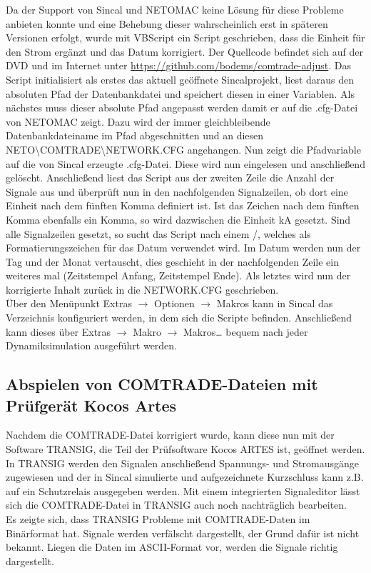 \documentclass{scrartcl}
\begin{document}
\begin{onehalfspace}
Da der Support von Sincal und NETOMAC keine Lösung für diese Probleme anbieten konnte und eine Behebung dieser wahrscheinlich erst in späteren Versionen erfolgt, wurde mit VBScript ein Script geschrieben, dass die Einheit für den Strom ergänzt und das Datum korrigiert. Der Quellcode befindet sich auf der DVD und im Internet unter \url{https://github.com/bodems/comtrade-adjust}. Das Script initialisiert als erstes das aktuell geöffnete Sincalprojekt, liest daraus den absoluten Pfad der Datenbankdatei und speichert diesen in einer Variablen. Als nächstes muss dieser absolute Pfad angepasst werden damit er auf die .cfg-Datei von NETOMAC zeigt. Dazu wird der immer gleichbleibende Datenbankdateiname im Pfad abgeschnitten und an diesen \glqq NETO\textbackslash COMTRADE\textbackslash NETWORK.CFG \grqq{} angehangen. Nun zeigt die Pfadvariable auf die von Sincal erzeugte .cfg-Datei. Diese wird nun eingelesen und anschließend gelöscht. Anschließend liest das Script aus der zweiten Zeile die Anzahl der Signale aus und überprüft nun in den nachfolgenden Signalzeilen, ob dort eine Einheit nach dem fünften Komma definiert ist. Ist das Zeichen nach dem fünften Komma ebenfalls ein Komma, so wird dazwischen die Einheit \glqq kA\grqq{} gesetzt. Sind alle Signalzeilen gesetzt, so sucht das Script nach einem \glqq /\grqq, welches als Formatierungszeichen für das Datum verwendet wird. Im Datum werden nun der Tag und der Monat vertauscht, dies geschieht in der nachfolgenden Zeile ein weiteres mal (Zeitstempel Anfang, Zeitstempel Ende). Als letztes wird nun der korrigierte Inhalt zurück in die NETWORK.CFG geschrieben. \\
Über den Menüpunkt Extras $\rightarrow$ Optionen $\rightarrow$ Makros kann in Sincal das Verzeichnis konfiguriert werden, in dem sich die Scripte befinden. Anschließend kann dieses über Extras $\rightarrow$ Makro $\rightarrow$ Makros… bequem nach jeder Dynamiksimulation ausgeführt werden.

\subsection{Abspielen von COMTRADE-Dateien mit Prüfgerät Kocos Artes}
Nachdem die COMTRADE-Datei korrigiert wurde, kann diese nun mit der Software TRANSIG, die Teil der Prüfsoftware Kocos ARTES ist, geöffnet werden. In TRANSIG werden den Signalen anschließend Spannungs- und Stromausgänge zugewiesen und der in Sincal simulierte und aufgezeichnete Kurzschluss kann z.B. auf ein Schutzrelais ausgegeben werden. Mit einem integrierten Signaleditor lässt sich die COMTRADE-Datei in TRANSIG auch noch nachträglich bearbeiten. \\
Es zeigte sich, dass TRANSIG Probleme mit COMTRADE-Daten im Binärformat hat. Signale werden verfälscht dargestellt, der Grund dafür ist nicht bekannt. Liegen die Daten im ASCII-Format vor, werden die Signale richtig dargestellt.



\end{onehalfspace}
\end{document}
